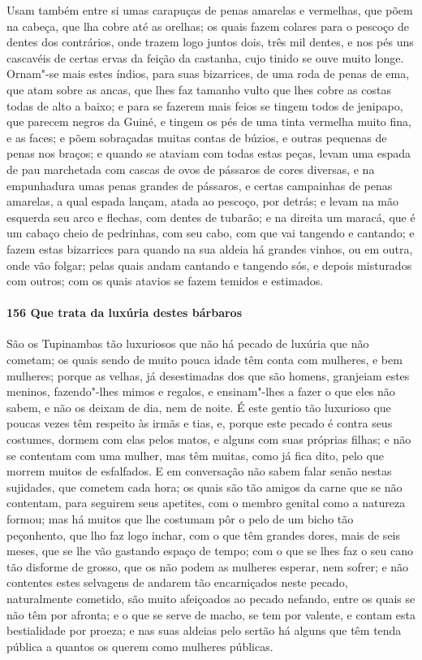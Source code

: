 Usam também entre si umas carapuças de penas amarelas e vermelhas, que põem na cabeça, que
lha cobre até as orelhas; os quais fazem colares para o pescoço de dentes dos contrários,
onde trazem logo juntos dois, três mil dentes, e nos pés uns cascavéis de certas ervas da
feição da castanha, cujo tinido se ouve muito longe. Ornam"-se mais estes índios, para suas
bizarrices, de uma roda de penas de ema, que atam sobre as ancas, que lhes faz tamanho
vulto que lhes cobre as costas todas de alto a baixo; e para se fazerem mais feios se
tingem todos de jenipapo, que parecem negros da Guiné, e tingem os pés de uma tinta
vermelha muito fina, e as faces; e põem sobraçadas muitas contas de búzios, e outras
pequenas de penas nos braços; e quando se ataviam com todas estas peças, levam uma espada
de pau marchetada com cascas de ovos de pássaros de cores diversas, e na empunhadura umas
penas grandes de pássaros, e certas campainhas de penas amarelas, a qual espada lançam,
atada ao pescoço, por detrás; e levam na mão esquerda seu arco e flechas, com dentes de
tubarão; e na direita um maracá, que é um cabaço cheio de pedrinhas, com seu cabo, com que
vai tangendo e cantando; e fazem estas bizarrices para quando na sua aldeia há grandes
vinhos, ou em outra, onde vão folgar; pelas quais andam cantando e tangendo sós, e depois
misturados com outros; com os quais atavios se fazem temidos e estimados.

\paragraph{156 Que trata da luxúria destes bárbaros}

São os Tupinambas tão luxuriosos que não há pecado de luxúria que não cometam; os quais
sendo de muito pouca idade têm conta com mulheres, e bem mulheres; porque as velhas, já
desestimadas dos que são homens, granjeiam estes meninos, fazendo"-lhes mimos e regalos, e
ensinam"-lhes a fazer o que eles não sabem, e não os deixam de dia, nem de noite. É este
gentio tão luxurioso que poucas vezes têm respeito às irmãs e tias, e, porque este pecado
é contra seus costumes, dormem com elas pelos matos, e alguns com suas próprias filhas; e
não se contentam com uma mulher, mas têm muitas, como já fica dito, pelo que morrem muitos
de esfalfados. E em conversação não sabem falar senão nestas sujidades, que cometem cada
hora; os quais são tão amigos da carne que se não contentam, para seguirem seus apetites,
com o membro genital como a natureza formou; mas há muitos que lhe costumam pôr o pelo de
um bicho tão peçonhento, que lho faz logo inchar, com o que têm grandes dores, mais de
seis meses, que se lhe vão gastando espaço de tempo; com o que se lhes faz o seu cano tão
disforme de grosso, que os não podem as mulheres esperar, nem sofrer; e não contentes
estes selvagens de andarem tão encarniçados neste pecado, naturalmente cometido, são muito
afeiçoados ao pecado nefando, entre os quais se não têm por afronta; e o que se serve de
macho, se tem por valente, e contam esta bestialidade por proeza; e nas suas aldeias pelo
sertão há alguns que têm tenda pública a quantos os querem como mulheres públicas.

